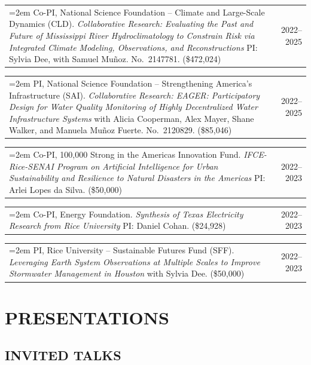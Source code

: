 \documentclass[10pt,oneside]{article}
\makeatletter
\newenvironment{alignedentrieshang}[1][2em]{%
  \noindent%
}{%
}
\newcommand{\hangingitem}[2]{%
  \noindent%
  \begin{tabular*}{\textwidth}{@{}p{0.85\textwidth}@{\extracolsep{\fill}}r@{}}%
    \hangindent=2em \hangafter=1 #1 & #2%
  \end{tabular*}%
}
\makeatother
\begin{document}
\begin{alignedentrieshang}
\hangingitem{Co-PI, National Science Foundation -- Climate and Large-Scale Dynamics (CLD). \textit{Collaborative Research: Evaluating the Past and Future of Mississippi River Hydroclimatology to Constrain Risk via Integrated Climate Modeling, Observations, and Reconstructions} PI: Sylvia Dee, with Samuel Muñoz. No.\ 2147781. (\$472,024)}{2022--2025}


\hangingitem{PI, National Science Foundation -- Strengthening America's Infrastructure (SAI). \textit{Collaborative Research: EAGER: Participatory Design for Water Quality Monitoring of Highly Decentralized Water Infrastructure Systems} with Alicia Cooperman, Alex Mayer, Shane Walker, and Manuela Muñoz Fuerte. No.\ 2120829. (\$85,046)}{2022--2025}


\hangingitem{Co-PI, 100,000 Strong in the Americas Innovation Fund. \textit{IFCE-Rice-SENAI Program on Artificial Intelligence for Urban Sustainability and Resilience to Natural Disasters in the Americas} PI: Arlei Lopes da Silva. (\$50,000)}{2022--2023}


\hangingitem{Co-PI, Energy Foundation. \textit{Synthesis of Texas Electricity Research from Rice University} PI: Daniel Cohan. (\$24,928)}{2022--2023}


\hangingitem{PI, Rice University -- Sustainable Futures Fund (SFF). \textit{Leveraging Earth System Observations at Multiple Scales to Improve Stormwater Management in Houston} with Sylvia Dee. (\$50,000)}{2022--2023}

\end{alignedentrieshang}
\section{PRESENTATIONS}

\subsection{INVITED TALKS}
\end{document}
